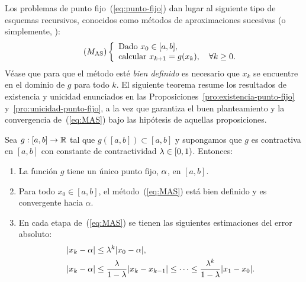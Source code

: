 Los problemas de punto fijo~(\ref{eq:punto-fijo}) dan lugar al
siguiente tipo de esquemas recursivos, conocidos como métodos de
aproximaciones sucesivas (o simplemente, ):
\begin{equation}
  \tag{$M_{\text{AS}}$}
  \left\{
    \begin{array}{l}
      \text{Dado } x_0\in [a,b], \\
      \text{calcular } x_{k+1}=g(x_k), \quad \forall k\ge 0.
    \end{array}
  \right.
  \label{eq:MAS}
\end{equation}
Véase que para que el método esté \textit{bien definido} es necesario
que $x_k$ se encuentre en el dominio de $g$ para todo $k$.
El siguiente teorema resume los resultados de existencia y unicidad
enunciados en las Proposiciones~\ref{pro:existencia-punto-fijo}
y~\ref{pro:unicidad-punto-fijo}, a la vez que garantiza el buen
planteamiento y la convergencia de~(\ref{eq:MAS}) bajo las hipótesis
de aquellas proposiciones.

\begin{theorem}
  \label{thm:punto-fijo-Banach}
  Sea $g:[a,b]\to\operatorname{{\mathbb R}}$ tal que $g([a,b]) \subset [a,b]$ y supongamos
  que $g$ es contractiva en $[a,b]$ con constante de contractividad
  $\lambda\in [0,1)$. Entonces:
  \begin{enumerate}
  \item
    \label{item:punto-fijo-Banach:1}
    La función $g$ tiene un \textsf{único punto fijo}, $\alpha$, en
    $[a,b]$.
  \item
    \label{item:punto-fijo-Banach:2}
    Para todo $x_0\in [a,b]$, el método~(\ref{eq:MAS}) está bien
    definido y es \textsf{convergente} hacia $\alpha$.
  \item En cada etapa de~(\ref{eq:MAS}) se tienen las siguientes
    \textsf{estimaciones} del error absoluto:
    \label{item:punto-fijo-Banach:3}
    \begin{align}
      \label{eq:pto-fijo:cota-a-priori}
      |x_k-\alpha| &\le \lambda^k |x_0-\alpha|,
      \\
      \label{eq:pto-fijo:cota-a-posteriori}
      |x_k-\alpha| &\le \frac{\lambda}{1-\lambda}
                    |x_k-x_{k-1}| \le \dots \le
                    \frac{\lambda^k}{1-\lambda}
                    |x_1-x_0|.
    \end{align}
  \end{enumerate}
\end{theorem}

